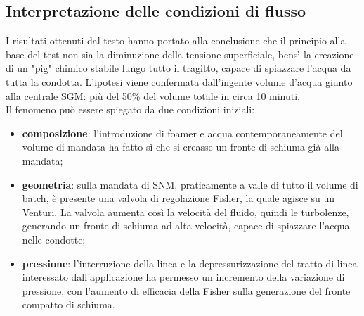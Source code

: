 \subsection{Interpretazione delle condizioni di flusso}
I risultati ottenuti dal testo hanno portato alla conclusione che il principio alla base del test non sia la diminuzione della tensione superficiale, bensì la creazione di un "pig" chimico stabile lungo tutto il tragitto, capace di spiazzare l'acqua da tutta la condotta. L'ipotesi viene confermata dall'ingente volume d'acqua giunto alla centrale SGM: più del 50\% del volume totale in circa 10 minuti.\\
Il fenomeno può essere spiegato da due condizioni iniziali:
\begin{itemize}
\item \textbf{composizione}: l'introduzione di foamer e acqua contemporaneamente del volume di mandata ha fatto sì che si creasse un fronte di schiuma già alla mandata;
\item \textbf{geometria}: sulla mandata di SNM, praticamente a valle di tutto il volume di batch, è presente una valvola di regolazione Fisher, la quale agisce su un Venturi. La valvola aumenta così la velocità del fluido, quindi le turbolenze, generando un fronte di schiuma ad alta velocità, capace di spiazzare l'acqua nelle condotte;
\item \textbf{pressione}: l'interruzione della linea e la depressurizzazione del tratto di linea interessato dall'applicazione ha permesso un incremento della variazione di pressione, con l'aumento di efficacia della Fisher sulla generazione del fronte compatto di schiuma.\\
\end{itemize}



\clearpage{\pagestyle{empty}\cleardoublepage}